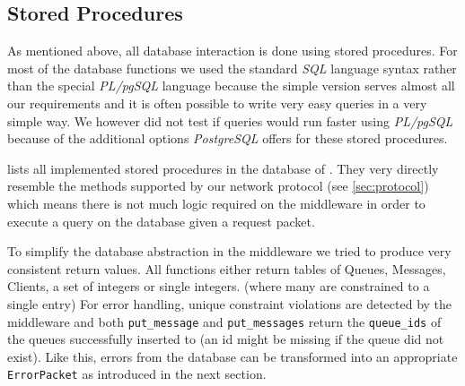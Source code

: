 \documentclass[a4paper, oneside]{csthesis}
\begin{document}
\subsection{Stored Procedures}
\label{sec:stored-procedures}

    As mentioned above, all database interaction is done using stored
    procedures. For most of the database functions we used the standard {\it SQL}
    language syntax rather than the special {\it PL/pgSQL} language because the
    simple version serves almost all our requirements and it is often possible
    to write very easy queries in a very simple way. We however did not test if
    queries would run faster using {\it PL/pgSQL} because of the additional
    options {\it PostgreSQL} offers for these stored
    procedures.

     lists all implemented stored procedures in
    the database of \telesto.
    They very directly resemble the methods supported by our network protocol
    (see \cref{sec:protocol}) which means there is not much logic required on
    the middleware in order to execute a query on the database given a request
    packet.
    
    To simplify the database abstraction in the middleware we tried to produce
    very consistent return values. All functions either return tables of Queues,
    Messages, Clients, a set of integers or single integers. (where many are
    constrained to a single entry) For error handling, unique constraint violations are detected
    by the middleware and both {\tt put\_message} and {\tt put\_messages} return
    the {\tt queue\_ids} of the queues successfully inserted to (an id might be
    missing if the queue did not exist). Like this, errors from the database can
    be transformed into an appropriate {\tt ErrorPacket} as introduced in the
    next section.
\end{document}
